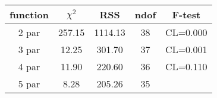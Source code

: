 \begin{tabular}{c|c|c|c|c}
function & $\chi^2$ & RSS & ndof & F-test \\
\hline
2 par & 257.15 & 1114.13 & 38 & CL=0.000 \\
3 par & 12.25 & 301.70 & 37 & CL=0.001 \\
4 par & 11.90 & 220.60 & 36 & CL=0.110 \\
5 par & 8.28 & 205.26 & 35 & \\
\hline
\end{tabular}
